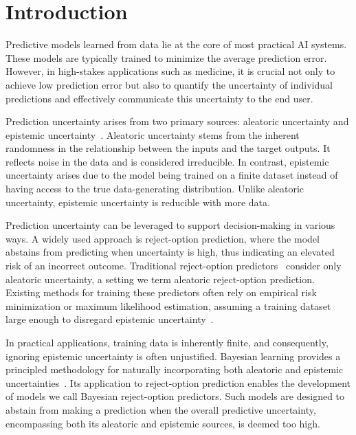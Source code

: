 \section{Introduction}

Predictive models learned from data lie at the core of most practical AI systems. These models are typically trained to minimize the average prediction error. However, in high-stakes applications such as medicine, it is crucial not only to achieve low prediction error but also to quantify the uncertainty of individual predictions and effectively communicate this uncertainty to the end user.

Prediction uncertainty arises from two primary sources: aleatoric uncertainty and epistemic uncertainty~\cite{Hullermeier-Intro-ML2021}. Aleatoric uncertainty stems from the inherent randomness in the relationship between the inputs and the target outputs. It reflects noise in the data and is considered irreducible. In contrast, epistemic uncertainty arises due to the model being trained on a finite dataset instead of having access to the true data-generating distribution. Unlike aleatoric uncertainty, epistemic uncertainty is reducible with more data.

\vspace{-0.1cm}

Prediction uncertainty can be leveraged to support decision-making in various ways. A widely used approach is reject-option prediction, where the model abstains from predicting when uncertainty is high, thus indicating an elevated risk of an incorrect outcome. Traditional reject-option predictors~\cite{Chow-RejectOpt-TIT1970} consider only aleatoric uncertainty, a setting we term aleatoric reject-option prediction. Existing methods for training these predictors often rely on empirical risk minimization or maximum likelihood estimation, assuming a training dataset large enough to disregard epistemic uncertainty~\cite{Hendrickx-MLwithRejectOpt-ML2024}.

\vspace{-0.1cm}

In practical applications, training data is inherently finite, and consequently, ignoring epistemic uncertainty is often unjustified. Bayesian learning provides a principled methodology for naturally incorporating both aleatoric and epistemic uncertainties~\cite{Bishop-PRML-2006,Gelman-Bayesian-2013}. Its application to reject-option prediction enables the development of models we call Bayesian reject-option predictors. Such models are designed to abstain from making a prediction when the overall predictive uncertainty, encompassing both its aleatoric and epistemic sources, is deemed too high.

